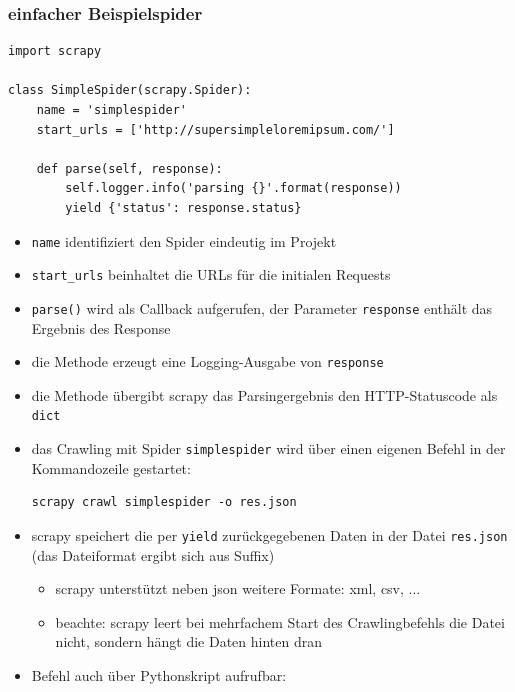 \documentclass{beamer}
\begin{document}

\begin{frame}
	\frametitle{einfacher Beispielspider}
			\begin{lstlisting}
import scrapy

class SimpleSpider(scrapy.Spider):
    name = 'simplespider'
    start_urls = ['http://supersimpleloremipsum.com/']

    def parse(self, response):
        self.logger.info('parsing {}'.format(response))
        yield {'status': response.status}
			\end{lstlisting}
			
	\framebreak
	
	\begin{itemize}
		\item \lstinline|name| identifiziert den Spider eindeutig im Projekt
		\item \lstinline|start_urls| beinhaltet die URLs für die initialen Requests
		\item \lstinline|parse()| wird als Callback aufgerufen, der Parameter \lstinline|response| enthält das Ergebnis des Response
		\item die Methode erzeugt eine Logging-Ausgabe von \lstinline|response| 
		\item die Methode übergibt scrapy das Parsingergebnis den HTTP-Statuscode als \lstinline|dict|
	\end{itemize}
	
	\framebreak
	
	
	\begin{itemize}
		\item das Crawling mit Spider \lstinline|simplespider| wird über einen eigenen Befehl in der Kommandozeile gestartet:
			\begin{lstlisting}
scrapy crawl simplespider -o res.json
			\end{lstlisting}
		\item scrapy speichert die per \lstinline|yield| zurückgegebenen Daten in der Datei \lstinline|res.json| (das Dateiformat ergibt sich aus Suffix) \begin{itemize}
			\item scrapy unterstützt neben json weitere Formate: xml, csv, ... 
			\item beachte: scrapy leert bei mehrfachem Start des Crawlingbefehls die Datei nicht, sondern hängt die Daten hinten dran
		\end{itemize}
		\item Befehl auch über Pythonskript aufrufbar: \begin{lstlisting}
		

\end{lstlisting}
\end{itemize}
\end{frame}
\end{document}
